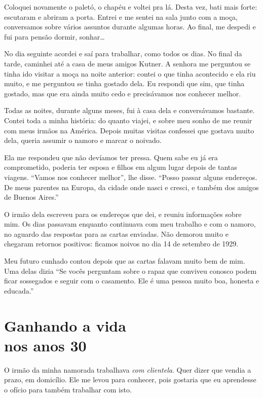 Coloquei novamente o paletó, o chapéu e voltei pra lá. Desta vez, bati mais
forte: escutaram e abriram a porta. Entrei e me sentei na sala junto com a moça, 
conversamos sobre vários assuntos durante algumas horas. Ao final, me
despedi e fui para pensão dormir, sonhar\ldots

No dia seguinte acordei e saí para trabalhar, como todos os dias. No final da tarde,
caminhei até a casa de meus amigos Kutner. A senhora me perguntou se
tinha ido visitar a moça na noite anterior: contei o que tinha
acontecido e ela riu muito, e me perguntou se tinha gostado dela. Eu respondi 
que sim, que tinha gostado, mas que era ainda muito
cedo e precisávamos nos conhecer melhor.

Todas as noites, durante alguns meses, fui à casa dela e conversávamos bastante. Contei toda a minha história: do quanto viajei, e
sobre meu sonho de me reunir com meus irmãos na América. Depois muitas visitas 
confessei que gostava muito dela, queria assumir o namoro e
marcar o noivado.

Ela me respondeu que não devíamos ter pressa. Quem sabe eu já era
comprometido, poderia ter esposa e filhos em algum lugar depois de tantas viagens. 
``Vamos nos conhecer melhor'', lhe disse. ``Posso passar alguns endereços. De meus parentes na Europa, da
cidade onde nasci e cresci, e também dos amigos de Buenos Aires.''

O irmão dela escreveu para os endereços que dei, e reuniu informações
sobre mim. Os dias passavam enquanto continuava com meu
trabalho e com o namoro, no aguardo das respostas para as cartas enviadas. Não
demorou muito e chegaram retornos positivos: ficamos noivos no dia 14 de
setembro de 1929.

Meu futuro cunhado contou depois que as cartas falavam muito bem de mim. Uma delas dizia ``Se vocês perguntam sobre o rapaz que conviveu
conosco podem ficar sossegados e seguir com o casamento. Ele é uma pessoa
muito boa, honesta e educada.''

\chapter*{Ganhando a vida\\nos anos 30}

O irmão da minha namorada trabalhava \textit{com clientela}. Quer dizer que vendia a
prazo, em domicílio. Ele me levou para conhecer, pois gostaria que eu aprendesse o ofício
para também trabalhar com isto.

